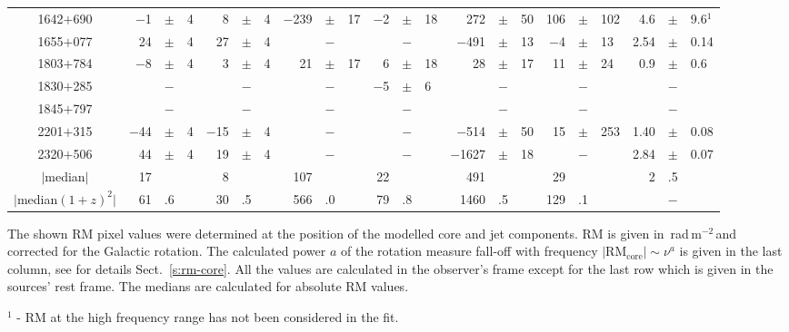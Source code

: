 \documentclass[a4paper,fleqn,usenatbib,useAMS]{mnras}
\newcommand{\rmu}{\,rad\,m$^{-2}$\,} %
\begin{document}
\begin{table*}
\begin{minipage}{175mm}
\begin{tabular}{cr@{}c@{}lr@{}c@{}lr@{}c@{}lr@{}c@{}lr@{}c@{}lr@{}c@{}lr@{}c@{}l}
1642$+$690&$-$1&$\pm$&4&	8&$\pm$&4&$-$239&$\pm$&17&$-$2&$\pm$&18&272&$\pm$&50&106&$\pm$&102&4.6&$\pm$&9.6$^1$\\
1655$+$077&24&$\pm$&4&27&$\pm$&4&&$-$&&&$-$&&$-$491&$\pm$&13&$-$4&$\pm$&13&2.54&$\pm$&0.14\\
1803$+$784&$-$8&$\pm$&4&	3&$\pm$&4&21&$\pm$&17&6&$\pm$&18&28&$\pm$&17&11&$\pm$&24&0.9&$\pm$&0.6\\
1830$+$285&&$-$&&	&$-$&&	&$-$&&$-$5&$\pm$&6&	&$-$&&	&$-$&&	&$-$&\\
1845$+$797&&$-$&&	&$-$&&	&$-$&&	&$-$&&	&$-$&&	&$-$&&	&$-$&\\
2201$+$315&$-$44&$\pm$&4&$-$15&$\pm$&4&	&$-$&&	&$-$&&$-$514&$\pm$&50&15&$\pm$&253&1.40&$\pm$&0.08\\
2320$+$506&44&$\pm$&4&19&$\pm$&4&	&$-$&&	&$-$&&$-$1627&$\pm$&18&	&$-$&&2.84&$\pm$&0.07\\
$|$median$|$&17&&&8&&&107&&&22&&&491&&&29&&&2&.5&\\
$|$median${(1+z)}^{2}|$&61&.6&&30&.5&&566&.0&&79&.8&&1460&.5&&129&.1&&&$-$&\\
\hline
\end{tabular}

\smallskip
 The shown RM pixel values were determined at the position of the modelled core and jet components.
 RM is given in \rmu and corrected for the Galactic rotation.
 The calculated power $a$ of the rotation measure fall-off with frequency $|\mathrm{RM}_\mathrm{core}|\sim{\nu}^{a}$ is given in the last column, see for details Sect.~\ref{s:rm-core}.
 All the values are calculated in the observer's frame except for the last row which is given in the sources' rest frame.
 The medians are calculated for absolute RM values. 
 
 $^1$ - RM at the high frequency range has not been considered in the fit.
 \label{frm}
\end{minipage}
\end{table*}
\end{document}
